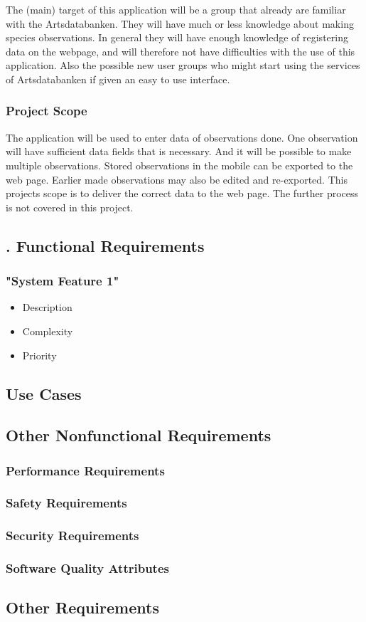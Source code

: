The (main) target of this application will be a group that already are familiar with the Artsdatabanken. They will have much or less knowledge about making species observations. In general they will have enough knowledge of registering data on the webpage, and will therefore not have difficulties with the use of this application. 
 Also the possible new user groups who might start using the services of Artsdatabanken if given an easy to use interface.


\subsubsection{ Project Scope}
The application will be used to enter data of observations done. One observation will have sufficient data fields that is necessary. And it will be possible to make multiple observations. Stored observations in the mobile can be exported to the web page. Earlier made observations may also be edited and re-exported.
This projects scope is to deliver the correct data to the web page. The further process is not covered in this project.


\pagebreak

\subsection{. Functional Requirements}
	\subsubsection{ "System Feature 1"}
	\begin{itemize}
		\item  Description
		\item  Complexity
		\item  Priority
	\end{itemize}

\pagebreak

\subsection{ Use Cases}

\pagebreak

\subsection{ Other Nonfunctional Requirements}
\subsubsection{Performance Requirements}
\subsubsection{ Safety Requirements}
\subsubsection{ Security Requirements}
\subsubsection{ Software Quality Attributes}

\subsection{ Other Requirements}
